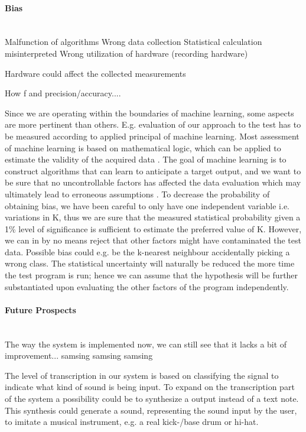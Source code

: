 \paragraph{Bias} \hspace{0pt} \\
%
Malfunction of algorithms
Wrong data collection
Statistical calculation misinterpreted
Wrong utilization of hardware (recording hardware)

Hardware could affect the collected measurements

How f and precision/accuracy....
 


Since we are operating within the boundaries of machine learning, some aspects are more pertinent than others. E.g. evaluation of our approach to the test has to be measured according to applied principal of machine learning. Most assessment of machine learning is based on mathematical logic, which can be applied to estimate the validity of the acquired data \citep{Gordon1995}. The goal of machine learning is to construct algorithms that can learn to anticipate a target output, and we want to be sure that no uncontrollable factors has affected the data evaluation which may ultimately lead to erroneous assumptions \citep{Gordon1995}. To decrease the probability of obtaining bias, we have been careful to only have one independent variable i.e. variations in K, thus we are sure that the measured statistical probability given a 1\% level of significance is sufficient to estimate the preferred value of K. However, we can in by no means reject that other factors might have contaminated the test data. Possible bias could e.g. be the k-nearest neighbour accidentally picking a wrong class. The statistical uncertainty will naturally be reduced the more time the test program is run; hence we can assume that the hypothesis will be further substantiated upon evaluating the other factors of the program independently.\\
\paragraph{Future Prospects} \hspace{0pt} \\
The way the system is implemented now, we can still see that it lacks a bit of improvement... samsing samsing samsing

The level of transcription in our system is based on classifying the signal to indicate what kind of sound is being input. To expand on the transcription part of the system a possibility could be to synthesize a output instead of a text note. This synthesis could generate a sound, representing the sound input by the user, to imitate a musical instrument, e.g. a real kick-/base drum or hi-hat.

